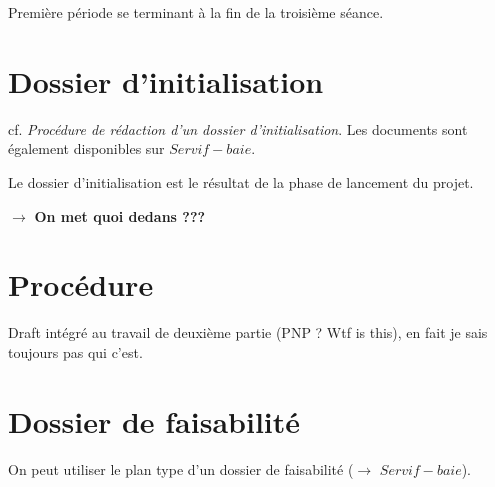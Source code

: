 Première période se terminant à la fin de la troisième séance.

\section{Dossier d'initialisation}

cf. \textit{Procédure de rédaction d'un dossier d'initialisation}. Les
documents sont également disponibles sur $Servif-baie$.

Le dossier d'initialisation est le résultat de la phase de lancement du projet. 

$\rightarrow$ \textbf{On met quoi dedans ???} %

\section{Procédure}

Draft intégré au travail de deuxième partie (PNP ? Wtf is this), en fait je
sais toujours pas qui c'est.

\section{Dossier de faisabilité}

On peut utiliser le plan type d'un dossier de faisabilité ($\rightarrow$
$Servif-baie$).


